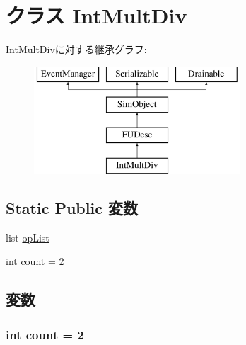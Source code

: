 \hypertarget{classFuncUnitConfig_1_1IntMultDiv}{
\section{クラス IntMultDiv}
\label{classFuncUnitConfig_1_1IntMultDiv}
}
IntMultDivに対する継承グラフ:\begin{figure}[H]
\begin{center}
\leavevmode
\includegraphics[height=4cm]{classFuncUnitConfig_1_1IntMultDiv}
\end{center}
\end{figure}
\subsection*{Static Public 変数}
\begin{DoxyCompactItemize}
\item 
list \hyperlink{classFuncUnitConfig_1_1IntMultDiv_a31b2f9e3ac9a504397b140f513c469cc}{opList}
\item 
int \hyperlink{classFuncUnitConfig_1_1IntMultDiv_ad43c3812e6d13e0518d9f8b8f463ffcf}{count} = 2
\end{DoxyCompactItemize}


\subsection{変数}
\hypertarget{classFuncUnitConfig_1_1IntMultDiv_ad43c3812e6d13e0518d9f8b8f463ffcf}{
\subsubsection[{count}]{\setlength{\rightskip}{0pt plus 5cm}int {\bf count} = 2}}
\label{classFuncUnitConfig_1_1IntMultDiv_ad43c3812e6d13e0518d9f8b8f463ffcf}


